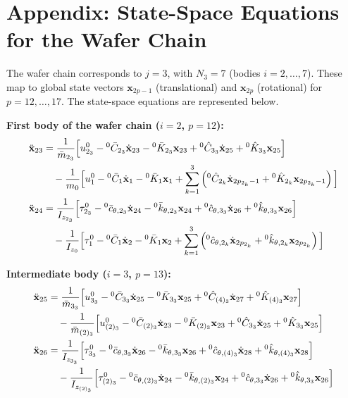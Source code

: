 \documentclass[11pt]{article}
\theoremstyle{definition}
\begin{document}
\section*{Appendix: State-Space Equations for the Wafer Chain}

The wafer chain corresponds to $j=3$, with $N_3=7$ (bodies $i=2, \ldots, 7$). These map to global state vectors $\mathbf{x}_{2p-1}$ (translational) and $\mathbf{x}_{2p}$ (rotational) for $p=12, \ldots, 17$. The state-space equations are represented below.

\textbf{First body of the wafer chain ($i=2$, $p=12$):}
\begin{align}
    \ddot{\mathbf{x}}_{23} &= 
    \frac{1}{\bar{m}_{2_3}} \Big[ u^0_{2_3} - {}^0\bar{C}_{2_3}\dot{\mathbf{x}}_{23} - {}^0\bar{K}_{2_3}\mathbf{x}_{23} + {}^0\hat{C}_{3_3}\dot{\mathbf{x}}_{25} + {}^0\hat{K}_{3_3}\mathbf{x}_{25} \Big] \notag \\
    &\quad - \frac{1}{m_0} \Big[ u^0_1 - {}^0\bar{C}_1\dot{\mathbf{x}}_{1} - {}^0\bar{K}_1 \mathbf{x}_{1} + \sum_{k=1}^3 \left( {}^0\hat{C}_{2_k}\dot{\mathbf{x}}_{2p_{2_k}-1} + {}^0\hat{K}_{2_k}\mathbf{x}_{2p_{2_k}-1} \right) \Big] \\
    \ddot{\mathbf{x}}_{24} &= 
    \frac{1}{I_{z_{2_3}}} \Big[ \tau^0_{2_3} - {}^0\bar{c}_{\theta,2_3}\dot{\mathbf{x}}_{24} - {}^0\bar{k}_{\theta,2_3}\mathbf{x}_{24} + {}^0\hat{c}_{\theta,3_3}\dot{\mathbf{x}}_{26} + {}^0\hat{k}_{\theta,3_3}\mathbf{x}_{26} \Big] \notag \\
    &\quad - \frac{1}{I_{z_0}} \Big[ \tau^0_1 - {}^0\bar{C}_1\dot{\mathbf{x}}_{2} - {}^0\bar{K}_1 \mathbf{x}_{2} + \sum_{k=1}^3 \left( {}^0\hat{c}_{\theta,2_k}\dot{\mathbf{x}}_{2p_{2_k}} + {}^0\hat{k}_{\theta,2_k}\mathbf{x}_{2p_{2_k}} \right) \Big]
\end{align}

\textbf{Intermediate body ($i=3$, $p=13$):}
\begin{align}
    \ddot{\mathbf{x}}_{25} &= 
    \frac{1}{\bar{m}_{3_3}} \Big[ u^0_{3_3} - {}^0\bar{C}_{3_3}\dot{\mathbf{x}}_{25} - {}^0\bar{K}_{3_3}\mathbf{x}_{25} + {}^0\hat{C}_{(4)_3}\dot{\mathbf{x}}_{27} + {}^0\hat{K}_{(4)_3}\mathbf{x}_{27} \Big] \notag \\
    &\quad - \frac{1}{\bar{m}_{(2)_3}} \Big[ u^0_{(2)_3} - {}^0\bar{C}_{(2)_3}\dot{\mathbf{x}}_{23} - {}^0\bar{K}_{(2)_3}\mathbf{x}_{23} + {}^0\hat{C}_{3_3}\dot{\mathbf{x}}_{25} + {}^0\hat{K}_{3_3}\mathbf{x}_{25} \Big] \\
    \ddot{\mathbf{x}}_{26} &= 
    \frac{1}{I_{z_{3_3}}} \Big[ \tau^0_{3_3} - {}^0\bar{c}_{\theta,3_3}\dot{\mathbf{x}}_{26} - {}^0\bar{k}_{\theta,3_3}\mathbf{x}_{26} + {}^0\hat{c}_{\theta,(4)_3}\dot{\mathbf{x}}_{28} + {}^0\hat{k}_{\theta,(4)_3}\mathbf{x}_{28} \Big] \notag \\
    &\quad - \frac{1}{I_{z_{(2)_3}}} \Big[ \tau^0_{(2)_3} - {}^0\bar{c}_{\theta,(2)_3}\dot{\mathbf{x}}_{24} - {}^0\bar{k}_{\theta,(2)_3}\mathbf{x}_{24} + {}^0\hat{c}_{\theta,3_3}\dot{\mathbf{x}}_{26} + {}^0\hat{k}_{\theta,3_3}\mathbf{x}_{26} \Big]
\end{align}
\end{document}
